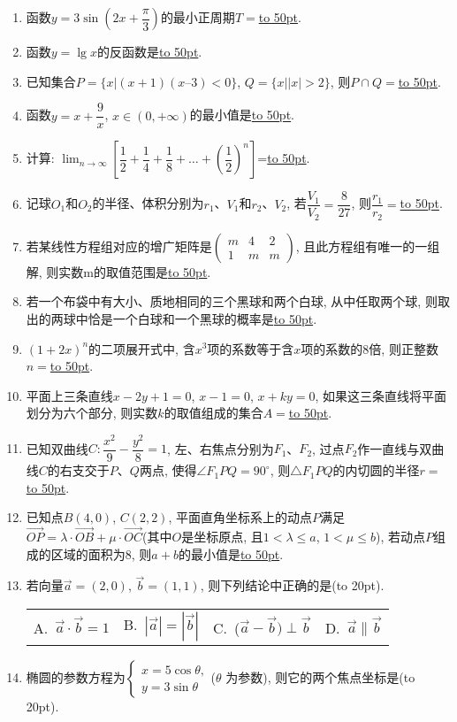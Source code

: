 \documentclass[10pt,a4paper]{article}
\newcommand{\blank}[1]{\underline{\hbox to #1pt{}}}
\newcommand{\bracket}[1]{(\hbox to #1pt{})}
\newcommand{\fourch}[4]{\par\begin{tabular}{p{.23\textwidth}p{.23\textwidth}p{.23\textwidth}p{.23\textwidth}}
A.~#1 &B.~#2& C.~#3& D.~#4
\end{tabular}}
\begin{document}
\begin{enumerate}[1.]

\item 函数$y=3\sin(2x+\dfrac{\pi}3)$的最小正周期$T=$\blank{50}.
\item 函数$y=\lg x$的反函数是\blank{50}.
\item 已知集合$P=\{x|(x+1)(x–3)<0\}$, $Q=\{x||x|>2\}$, 则$P\cap Q=$\blank{50}.
\item 函数$y=x+\dfrac 9x$, $x\in (0,+\infty)$的最小值是\blank{50}.
\item 计算: $\displaystyle\lim_{n\to \infty}[\dfrac 12+\dfrac 14+\dfrac 18+\ldots +(\dfrac 12)^n]$=\blank{50}.
\item 记球$O_1$和$O_2$的半径、体积分别为$r_1$、$V_1$和$r_2$、$V_2$, 若$\dfrac{V_1}{V_2}=\dfrac 8{27}$, 则$\dfrac{r_1}{r_2}=$\blank{50}.
\item 若某线性方程组对应的增广矩阵是$\begin{pmatrix}   m & 4 & 2  \\1 & m & m  \end{pmatrix}$, 且此方程组有唯一的一组解, 则实数m的取值范围是\blank{50}.
\item 若一个布袋中有大小、质地相同的三个黑球和两个白球, 从中任取两个球, 则取出的两球中恰是一个白球和一个黑球的概率是\blank{50}.
\item $(1+2x)^n$的二项展开式中, 含$x^3$项的系数等于含$x$项的系数的$8$倍, 则正整数$n=$\blank{50}.
\item 平面上三条直线$x-2y+1=0$, $x-1=0$, $x+ky=0$, 如果这三条直线将平面划分为六个部分, 则实数$k$的取值组成的集合$A=$\blank{50}.
\item 已知双曲线$C: \dfrac{x^2}9-\dfrac{y^2}8=1$, 左、右焦点分别为$F_1$、$F_2$, 过点$F_2$作一直线与双曲线$C$的右支交于$P$、$Q$两点, 使得$\angle F_1PQ=90^\circ$, 则$\triangle F_1PQ$的内切圆的半径$r=$\blank{50}.
\item 已知点$B(4,0)$, $C(2,2)$, 平面直角坐标系上的动点$P$满足$\overrightarrow{OP}=\lambda \cdot \overrightarrow{OB}+\mu \cdot \overrightarrow{OC}$(其中$O$是坐标原点, 且$1<\lambda \le a$, $1<\mu \le b$), 若动点$P$组成的区域的面积为$8$, 则$a+b$的最小值是\blank{50}.
\item 若向量$\overrightarrow a=(2,0)$, $\overrightarrow b=(1,1)$, 则下列结论中正确的是\bracket{20}.
\fourch{$\overrightarrow a\cdot \overrightarrow b=1$}{$|\overrightarrow a|=|\overrightarrow b|$}{($\overrightarrow a-\overrightarrow b)\perp \overrightarrow b$}{$\overrightarrow a\parallel \overrightarrow b$}
\item 椭圆的参数方程为$\begin{cases} x=5\cos \theta,  \\ y=3\sin \theta  \end{cases}$($\theta$ 为参数), 则它的两个焦点坐标是\bracket{20}.

\end{enumerate}
\end{document}
